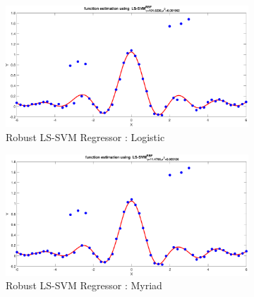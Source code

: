 \begin{figure}[!ht] 
	\begin{subfigure}{.35\textwidth}
		\centering
		\captionsetup{width=0.8\linewidth}
		\includegraphics[height=.65\linewidth, width=0.9\linewidth]{Exercise2/Report/robust_logistic}
		\caption{Robust LS-SVM Regressor : Logistic}
		\label{fig:rob_nooutliers}
	\end{subfigure}%
	\begin{subfigure}{.35\textwidth}
		\centering
		\captionsetup{width=0.8\linewidth}
		\includegraphics[height=.65\linewidth, width=0.9\linewidth]{Exercise2/Report/robust_myriad}
		\caption{Robust LS-SVM Regressor : Myriad}
		\label{fig:rob_myriad}
	\end{subfigure}%
	\begin{subfigure}{.35\textwidth}
		\centering
		\captionsetup{width=0.8\linewidth}

\end{subfigure}
\end{figure}
